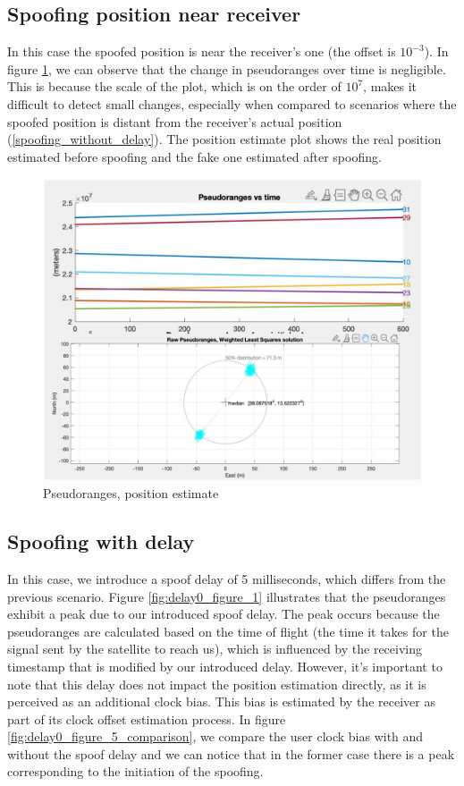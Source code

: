 \subsection{Spoofing position near receiver}
\label{spoof_near_receiver}
In this case the spoofed position is near the receiver's one (the offset is $10^{-3}$). In figure \ref{fig:delay0}, we can observe that the change in pseudoranges over time is negligible. This is because the scale of the plot, which is on the order of $10^{7}$, makes it difficult to detect small changes, especially when compared to scenarios where the spoofed position is distant from the receiver's actual position (\ref{spoofing_without_delay}). The position estimate plot shows the real position estimated before spoofing and the fake one estimated after spoofing.

\begin{figure}[!htb]
\includegraphics[scale=0.18]{images/delay0_figure_1_4.pdf}
\caption{Pseudoranges, position estimate}
\label{fig:delay0}
\end{figure}

\subsection{Spoofing with delay}
In this case, we introduce a spoof delay of 5 milliseconds, which differs from the previous scenario. Figure \ref{fig:delay0_figure_1} illustrates that the pseudoranges exhibit a peak due to our introduced spoof delay. The peak occurs because the pseudoranges are calculated based on the time of flight (the time it takes for the signal sent by the satellite to reach us), which is influenced by the receiving timestamp that is modified by our introduced delay. However, it's important to note that this delay does not impact the position estimation directly, as it is perceived as an additional clock bias. This bias is estimated by the receiver as part of its clock offset estimation process. In figure \ref{fig:delay0_figure_5_comparison}, we compare the user clock bias with and without the spoof delay and we can notice that in the former case there is a peak corresponding to the initiation of the spoofing.

